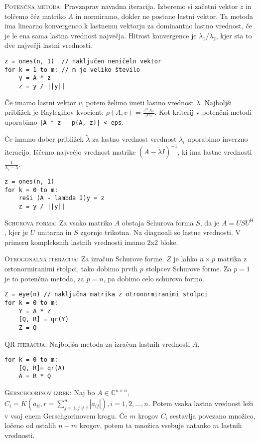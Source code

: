 \documentclass[a4paper,10pt]{article}
\theoremstyle{definition}
\def\C{\mathbb{C}}
\renewcommand{\H}{\mathsf{H}\!}
\begin{document}
\textsc{Potenčna metoda:} Pravzaprav navadna iteracija. Izberemo si začetni
vektor $z$ in tolčemo č\'{e}z matriko $A$ in normiramo, dokler ne postane lastni vektor. Ta
metoda ima linearno konvergenco k lastnemu vektorju za dominantno lastno
vrednost, če je le ena sama lastna vrednost največja.
Hitrost konvergence je $\lambda_1 / \lambda_2$, kjer sta to dve
največji lastni vrednosti.
\scriptsize
\begin{verbatim}
z = ones(n, 1)  // naključen neničeln vektor
for k = 1 to m: // m je veliko število
    y = A * z
    z = y / ||y||
\end{verbatim}
\normalsize
Če imamo lastni vektor $v$, potem želimo imeti lastno vrednost $\lambda$.
Najboljši približek je Raylegihov kvocient: $\rho(A, v) = \frac{z^\H\!\!Az}{z^\H
z}$.
Kot kriterij v potenčni metodi uporabimo \verb'|A * z - p(A, z)| < eps'.

Če imamo dober približek $\tilde{\lambda}$ za lastno vrednost vrednost
$\lambda_i$ uporabimo inverzno iteracijo. Iščemo največjo vrednost matrike
$(A-\tilde{\lambda}I)^{-1}$, ki
ima lastne vrednosti $\frac{1}{\lambda_i - \lambda}$.
\scriptsize
\begin{verbatim}
z = ones(n, 1)
for k = 0 to m:
    reši (A - lambda I)y = z
    z = y / ||y||
\end{verbatim}
\normalsize

\textsc{Schurova forma:} Za vsako matriko $A$ obstaja Schurova forma $S$, da je
$A = USU^\H$,
kjer je $U$ unitarna in $S$ zgornje trikotna. Na diagnoali so lastne vrednosti.
V primeru kompleksnih lastnih vrednosti imamo 2x2 bloke.

\textsc{Otrogonalna iteracija:} Za izračun Schurove forme. $Z$ je lahko $n\times
p$ matrika z ortonormiranimi stolpci, tako dobimo prvih $p$ stolpcev Schurove
forme. Za $p = 1$ je to potenčna metoda, za $p = n$, pa dobimo celo schurovo
formo.
\scriptsize
\begin{verbatim}
Z = eye(n) // naključna matrika z otronormiranimi stolpci
for k = 0 to m:
    Y = A * Z
    [Q, R] = qr(Y)
    Z = Q
\end{verbatim}
\normalsize

\textsc{QR iteracija:} Najboljša metoda za izračun lastnih vrednosti $A$.
\scriptsize
\begin{verbatim}
for k = 0 to m:
    [Q, R]= qr(A)
    A = R * Q
\end{verbatim}
\normalsize

\textsc{Gerschgorinov izrek:} Naj bo $A \in \C ^{n\times n}$, $C_i =
\overline{K}(a_{ii}, r=\sum_{j=1, j \neq i}^n | a_{ij}|), i=1,2,\ldots ,n$.
Potem vsaka lastna vrednost leži v vsaj enem Gerschgorinovem krogu. Če $m$
krogov $C_i$ sestavlja povezano množico, ločeno od ostalih $n-m$ krogov, potem
ta množica vsebuje natanko $m$ lastnih vrednosti.
\end{document}
